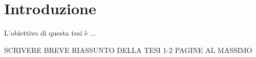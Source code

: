 \chapter*{Introduzione}
L'obiettivo di questa tesi è ...

SCRIVERE BREVE RIASSUNTO DELLA TESI 1-2 PAGINE AL MASSIMO
